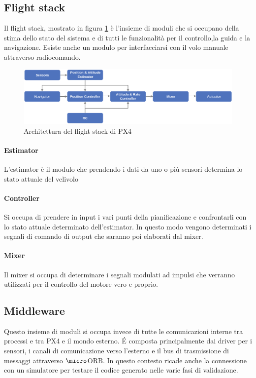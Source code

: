 \begin{it}
	\subsection{Flight stack}
	Il flight stack, mostrato in figura \ref{fig:px4.flightstack} è l'insieme di moduli che si occupano della stima dello stato del sistema e di tutti le funzionalità per il controllo,la guida e la navigazione. Esiste anche un modulo per interfacciarsi con il volo manuale attraverso radiocomando.
		\begin{figure}[ht]
		\centering
		\includegraphics[width=1\textwidth]{Contestualizzazione/Figure/PX4_High-Level_Flight-Stack}
		\caption{Architettura del flight stack di PX4}
		\label{fig:px4.flightstack}
	\end{figure}
	\paragraph{Estimator}
	L'estimator è il modulo che prendendo i dati da uno o più sensori determina lo stato attuale del velivolo
	\paragraph{Controller}
	Si occupa di prendere in input i vari punti della pianificazione e confrontarli con lo stato attuale determinato dell'estimator. In questo modo vengono determinati i segnali di comando di output che saranno poi elaborati dal mixer.
	\paragraph{Mixer}
	Il mixer si occupa di determinare i segnali modulati ad impulsi che verranno utilizzati per il controllo del motore vero e proprio.
	\subsection{Middleware}
	Questo insieme di moduli si occupa invece di tutte le comunicazioni interne tra processi e tra PX4 e il mondo esterno. \'E composta principalmente dai driver per i sensori, i canali di comunicazione verso l'esterno e il bus di trasmissione di messaggi attraverso $\micro$ORB. In questo contesto ricade anche  la connessione con un simulatore per testare il codice generato nelle varie fasi di validazione.

\end{it}
